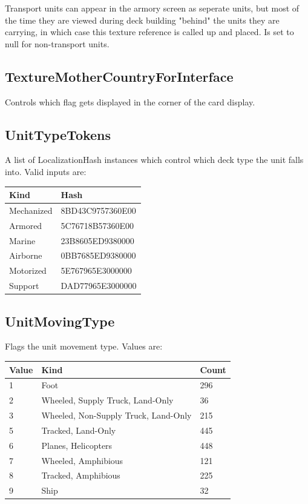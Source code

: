 \documentclass{article}
\begin{document}
Transport units can appear in the armory screen as seperate units, but most of the time they are viewed during deck building "behind" the units they are carrying, in which case this texture reference is called up and placed. Is set to null for non-transport units.

\subsection{TextureMotherCountryForInterface}

Controls which flag gets displayed in the corner of the card display.

\subsection{UnitTypeTokens}

A list of LocalizationHash instances which control which deck type the unit falls into. Valid inputs are:

\begin{center}
    \begin{tabular}{ | l | l |}
    \hline
	Kind & Hash\\ \hline
	Mechanized & 8BD43C9757360E00\\
	Armored & 5C76718B57360E00\\
	Marine & 23B8605ED9380000\\
	Airborne & 0BB7685ED9380000\\
	Motorized & 5E767965E3000000\\
	Support & DAD77965E3000000\\
    \hline
    \end{tabular}
\end{center}

\subsection{UnitMovingType}

Flags the unit movement type. Values are:

\begin{center}
    \begin{tabular}{ | l | l | l |}
    \hline
	Value & Kind & Count\\ \hline
	1 & Foot & 296\\
	2 & Wheeled, Supply Truck, Land-Only & 36\\
	3 & Wheeled, Non-Supply Truck, Land-Only & 215\\
	5 & Tracked, Land-Only & 445\\
	6 & Planes, Helicopters & 448\\
	7 & Wheeled, Amphibious & 121\\
	8 & Tracked, Amphibious & 225\\
	9 & Ship & 32\\
    \hline
    \end{tabular}
\end{center}
\end{document}

